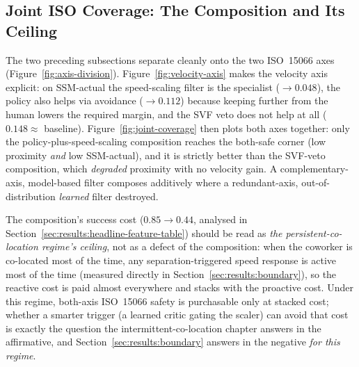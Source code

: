 \documentclass[11pt,a4paper]{report}
\newcommand{\ssm}{SSM}
\newcommand{\iso}{ISO~15066}
\begin{document}
\subsection{Joint ISO Coverage: The Composition and Its Ceiling}
\label{sec:results:joint-coverage}

The two preceding subsections separate cleanly onto the two \iso{}
axes (Figure~\ref{fig:axis-division}).
Figure~\ref{fig:velocity-axis} makes the velocity axis explicit:
on \ssm{}-actual the speed-scaling filter is the specialist
($\rightarrow 0.048$), the policy also helps via avoidance
($\rightarrow 0.112$) because keeping further from the human lowers the
required margin, and the SVF veto does not help at all ($0.148 \approx$
baseline). Figure~\ref{fig:joint-coverage} then plots both axes
together: only the policy-plus-speed-scaling composition reaches the
both-safe corner (low proximity \emph{and} low \ssm{}-actual), and it
is strictly better than the SVF-veto composition, which \emph{degraded}
proximity with no velocity gain. A complementary-axis, model-based
filter composes additively where a redundant-axis, out-of-distribution
\emph{learned} filter destroyed.

The composition's success cost ($0.85 \to 0.44$, analysed in
Section~\ref{sec:results:headline-feature-table}) should be read as
\emph{the persistent-co-location regime's ceiling}, not as a defect of
the composition: when the coworker is co-located most of the time,
any separation-triggered speed response is active most of the time
(measured directly in Section~\ref{sec:results:boundary}), so the
reactive cost is paid almost everywhere and stacks with the
proactive cost. Under this regime, both-axis \iso{} safety is
purchasable only at stacked cost; whether a smarter trigger
(a learned critic gating the scaler) can avoid that cost is exactly
the question the intermittent-co-location chapter answers in the
affirmative, and Section~\ref{sec:results:boundary} answers in the
negative \emph{for this regime}.
\end{document}
